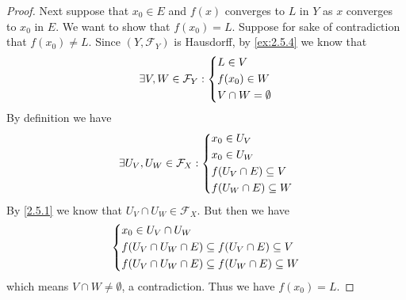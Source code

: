 \begin{proof}
  Next suppose that \(x_0 \in E\) and \(f(x)\) converges to \(L\) in \(Y\) as \(x\) converges to \(x_0\) in \(E\).
  We want to show that \(f(x_0) = L\).
  Suppose for sake of contradiction that \(f(x_0) \neq L\).
  Since \((Y, \mathcal{F}_Y)\) is Hausdorff, by \cref{ex:2.5.4} we know that
  \[
    \exists V, W \in \mathcal{F}_Y : \begin{dcases}
      L \in V      \\
      f(x_0) \in W \\
      V \cap W = \emptyset
    \end{dcases}
  \]
  By definition we have
  \[
    \exists U_V, U_W \in \mathcal{F}_X : \begin{dcases}
      x_0 \in U_V               \\
      x_0 \in U_W               \\
      f(U_V \cap E) \subseteq V \\
      f(U_W \cap E) \subseteq W
    \end{dcases}
  \]
  By \cref{2.5.1} we know that \(U_V \cap U_W \in \mathcal{F}_X\).
  But then we have
  \[
    \begin{dcases}
      x_0 \in U_V \cap U_W                                       \\
      f(U_V \cap U_W \cap E) \subseteq f(U_V \cap E) \subseteq V \\
      f(U_V \cap U_W \cap E) \subseteq f(U_W \cap E) \subseteq W
    \end{dcases}
  \]
  which means \(V \cap W \neq \emptyset\), a contradiction.
  Thus we have \(f(x_0) = L\).


\end{proof}
